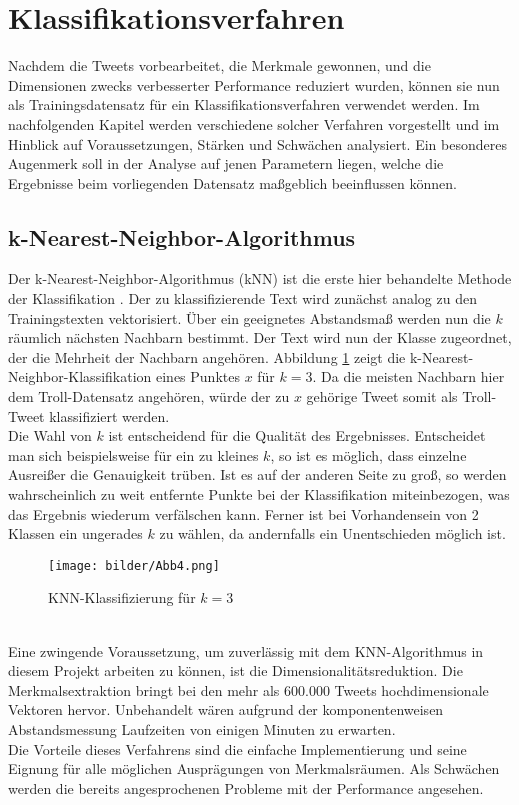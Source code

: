 \section{Klassifikationsverfahren}\label{clf}\raggedbottom
Nachdem die Tweets vorbearbeitet, die Merkmale gewonnen, und die Dimensionen zwecks verbesserter Performance reduziert wurden, können sie nun als Trainingsdatensatz für ein Klassifikationsverfahren verwendet werden. Im nachfolgenden Kapitel werden verschiedene solcher Verfahren vorgestellt und im Hinblick auf Voraussetzungen, Stärken und Schwächen analysiert. Ein besonderes Augenmerk soll in der Analyse auf jenen Parametern liegen, welche die Ergebnisse beim vorliegenden Datensatz maßgeblich beeinflussen können.    
\subsection{k-Nearest-Neighbor-Algorithmus}
Der k-Nearest-Neighbor-Algorithmus (kNN) ist die erste hier behandelte Methode der Klassifikation \citep{Guo04}. Der zu klassifizierende Text wird zunächst analog zu den Trainingstexten vektorisiert. Über ein geeignetes Abstandsmaß werden nun die $k$ räumlich nächsten Nachbarn bestimmt. Der Text wird nun der Klasse zugeordnet, der die Mehrheit der Nachbarn angehören. Abbildung \ref{knn-alg} zeigt die k-Nearest-Neighbor-Klassifikation eines Punktes $x$ für $k=3$. Da die meisten Nachbarn hier dem Troll-Datensatz angehören, würde der zu $x$ gehörige Tweet somit als Troll-Tweet klassifiziert werden.\\
Die Wahl von $k$ ist entscheidend für die Qualität des Ergebnisses. Entscheidet man sich beispielsweise für ein zu kleines $k$, so ist es möglich, dass einzelne Ausreißer die Genauigkeit trüben. Ist es auf der anderen Seite zu groß, so werden wahrscheinlich zu weit entfernte Punkte bei der Klassifikation miteinbezogen, was das Ergebnis wiederum verfälschen kann. Ferner ist bei Vorhandensein von 2 Klassen ein ungerades $k$ zu wählen, da andernfalls ein Unentschieden möglich ist.\\
\begin{figure}[htb]
	\begin{center}
		\texttt{[image: bilder/Abb4.png]}
		\caption{KNN-Klassifizierung für $k=3$}\label{knn-alg}
	\end{center}
\end{figure}\\
Eine zwingende Voraussetzung, um zuverlässig mit dem KNN-Algorithmus in diesem Projekt arbeiten zu können, ist die Dimensionalitätsreduktion. Die Merkmalsextraktion bringt bei den mehr als 600.000 Tweets hochdimensionale Vektoren hervor. Unbehandelt wären aufgrund der komponentenweisen Abstandsmessung Laufzeiten von einigen Minuten zu erwarten.\\
Die Vorteile dieses Verfahrens sind die einfache Implementierung und seine Eignung für alle möglichen Ausprägungen von Merkmalsräumen. Als Schwächen werden die bereits angesprochenen Probleme mit der Performance angesehen.
